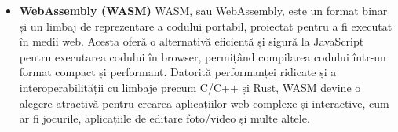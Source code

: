 \begin{itemize}
	\item \textbf{WebAssembly (WASM)} WASM, sau WebAssembly, este un format
	      binar și un limbaj de reprezentare a codului portabil, proiectat pentru a
	      fi executat în medii web. Acesta oferă o alternativă eficientă și sigură la
	      JavaScript pentru executarea codului în browser, permițând compilarea codului
	      într-un format compact și performant. Datorită performanței ridicate și a
	      interoperabilității cu limbaje precum C/C++ și Rust, WASM devine o
	      alegere atractivă pentru crearea aplicațiilor web complexe și interactive,
	      cum ar fi jocurile, aplicațiile de editare foto/video și multe altele.
\end{itemize}
